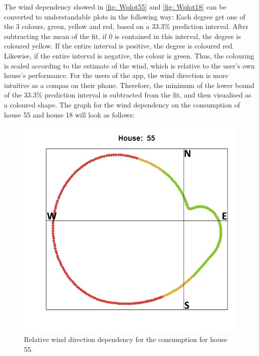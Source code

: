 \noindent The wind dependency showed in \cref{fig: Wplot55} and \cref{fig: Wplot18} can be converted to understandable plots in the following way: Each degree get one of the 3 colours, green, yellow and red, based on a 33.3\% prediction interval.  After subtracting the mean of the fit, if 0 is contained in this interval, the degree is coloured yellow.  If the entire interval is positive, the degree is coloured red.  Likewise, if the entire interval is negative, the colour is green. Thus, the colouring is scaled according to the estimate of the wind, which is relative to the user's own house's performance. For the users of the app, the wind direction is more intuitive as a compas on their phone.  Therefore, the minimum of the lower bound of the 33.3\% prediction interval is subtracted from the fit, and then visualised as a coloured shape. The graph for the wind dependency on the consumption of house 55 and house 18 will look as follows: 
\begin{figure}
    \centering
    \includegraphics[width=.8\textwidth]{../../../figures/WKplot55.jpeg}
    \caption{Relative wind direction dependency for the consumption for house 55.}
    \label{fig: WKplot55}
\end{figure}
